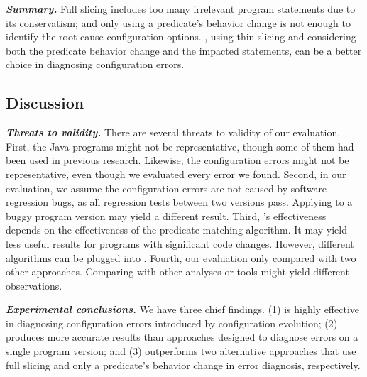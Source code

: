 \vspace{1mm}
\noindent \textbf{\textit{Summary.}} Full slicing
includes too many irrelevant program statements due to its
conservatism; and only using a predicate's behavior
change is not enough to identify the root cause configuration options.
\ourtool, using thin slicing and considering both
the predicate behavior change and the impacted statements,
can be a better choice in diagnosing configuration errors.

\subsection{Discussion}

\noindent \textbf{\textit{Threats to validity.}}
There are several threats to validity of our evaluation.
First, the \subjnum Java programs might not be representative, though some of them had been
used in previous research. Likewise, the
\errornum configuration errors might not be representative, even though we
evaluated every error we found. 
Second, in our evaluation, we assume the configuration errors
are not caused by software regression bugs, as all regression
tests between two versions pass. Applying \ourtool to a buggy
program version may yield a different result.
Third, \ourtool's effectiveness depends on the effectiveness of the
predicate matching algorithm. It may yield less
useful results for programs with significant code changes.
However, different algorithms can be plugged into \ourtool.
Fourth, our evaluation only compared \ourtool with two other
approaches. Comparing with other analyses or tools might yield
different observations.

\vspace{1mm}

\noindent \textbf{\textit{Experimental conclusions.}}
We have three chief findings. (1) \ourtool is highly effective
in diagnosing configuration errors introduced by configuration
evolution; (2) \ourtool produces more accurate results than
approaches designed to diagnose errors on a single program version;
and (3) \ourtool outperforms two alternative approaches
that use full slicing and only  a predicate's
behavior change in error diagnosis, respectively.

